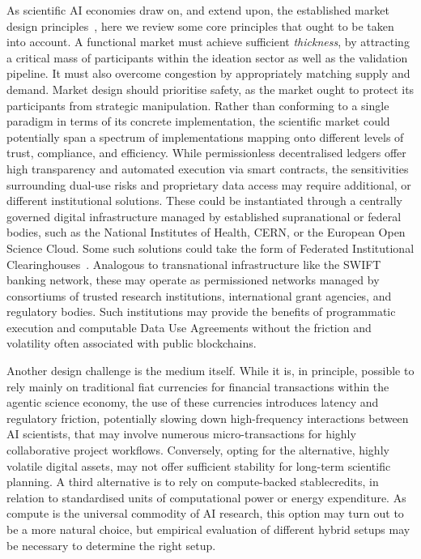 \documentclass[11pt, a4paper, twocolumn, goog]{google}
\begin{document}
As scientific AI economies draw on, and extend upon, the established market design principles~\citep{roth2002economist}, here we review some core principles that ought to be taken into account. A functional market must achieve sufficient \emph{thickness}, by attracting a critical mass of participants within the ideation sector as well as the validation pipeline. It must also overcome congestion by appropriately matching supply and demand. Market design should prioritise safety, as the market ought to protect its participants from strategic manipulation. Rather than conforming to a single paradigm in terms of its concrete implementation, the scientific market could potentially span a spectrum of implementations mapping onto different levels of trust, compliance, and efficiency. While permissionless decentralised ledgers offer high transparency and automated execution via smart contracts, the sensitivities surrounding dual-use risks and proprietary data access may require additional, or different institutional solutions. These could be instantiated through a centrally governed digital infrastructure managed by established supranational or federal bodies, such as the National Institutes of Health, CERN, or the European Open Science Cloud. Some such solutions could take the form of Federated Institutional Clearinghouses~\citep{millo2005organised}. Analogous to transnational infrastructure like the SWIFT banking network, these may operate as permissioned networks managed by consortiums of trusted research institutions, international grant agencies, and regulatory bodies. Such institutions may provide the benefits of programmatic execution and computable Data Use Agreements without the friction and volatility often associated with public blockchains.

Another design challenge is the medium itself. While it is, in principle, possible to rely mainly on traditional fiat currencies for financial transactions within the agentic science economy, the use of these currencies introduces latency and regulatory friction, potentially slowing down high-frequency interactions between AI scientists, that may involve numerous micro-transactions for highly collaborative project workflows. Conversely, opting for the alternative, highly volatile digital assets, may not offer sufficient stability for long-term scientific planning. A third alternative is to rely on compute-backed stablecredits, in relation to standardised units of computational power or energy expenditure. As compute is the universal commodity of AI research, this option may turn out to be a more natural choice, but empirical evaluation of different hybrid setups may be necessary to determine the right setup.
\end{document}
